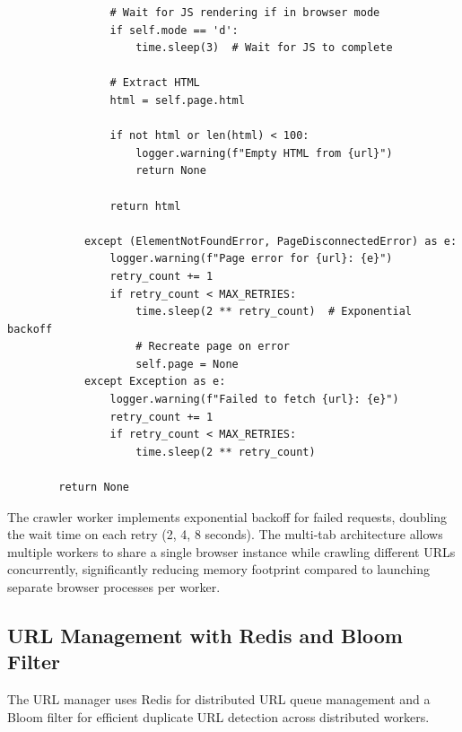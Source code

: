 \begin{lstlisting}
                # Wait for JS rendering if in browser mode
                if self.mode == 'd':
                    time.sleep(3)  # Wait for JS to complete
                
                # Extract HTML
                html = self.page.html
                
                if not html or len(html) < 100:
                    logger.warning(f"Empty HTML from {url}")
                    return None
                
                return html
            
            except (ElementNotFoundError, PageDisconnectedError) as e:
                logger.warning(f"Page error for {url}: {e}")
                retry_count += 1
                if retry_count < MAX_RETRIES:
                    time.sleep(2 ** retry_count)  # Exponential backoff
                    # Recreate page on error
                    self.page = None
            except Exception as e:
                logger.warning(f"Failed to fetch {url}: {e}")
                retry_count += 1
                if retry_count < MAX_RETRIES:
                    time.sleep(2 ** retry_count)
        
        return None
\end{lstlisting}

The crawler worker implements exponential backoff for failed requests, doubling the wait time on each retry (2, 4, 8 seconds). The multi-tab architecture allows multiple workers to share a single browser instance while crawling different URLs concurrently, significantly reducing memory footprint compared to launching separate browser processes per worker.

\subsection{URL Management with Redis and Bloom Filter}

The URL manager uses Redis for distributed URL queue management and a Bloom filter for efficient duplicate URL detection across distributed workers.

